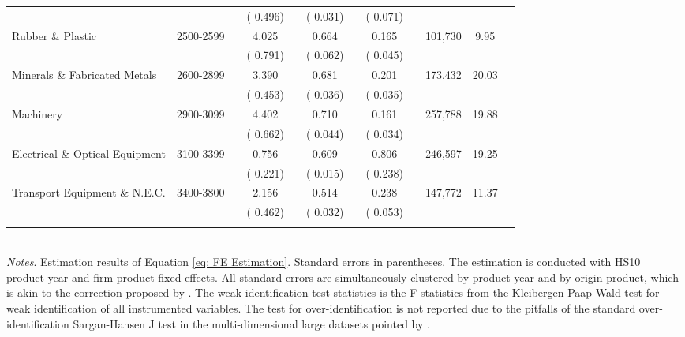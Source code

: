 \begin{adjustwidth}{-0.25in}{-0.0in}
\begin{tabular}{lccccccccccc}
& && \footnotesize( 0.496) && \footnotesize( 0.031) && \footnotesize( 0.071) &&   &   \\ \addlinespace                                                                                                            Rubber \& Plastic  & 2500-2599 && 4.025&& 0.664&& 0.165&&  101,730&9.95\\
& && \footnotesize( 0.791) && \footnotesize( 0.062) && \footnotesize( 0.045) &&   &   \\ \addlinespace                                                                                                            Minerals \& Fabricated Metals  & 2600-2899 && 3.390&& 0.681&& 0.201&&  173,432&20.03\\
& && \footnotesize( 0.453) && \footnotesize( 0.036) && \footnotesize( 0.035) &&   &   \\ \addlinespace                                                                                                            Machinery  & 2900-3099 && 4.402&& 0.710&& 0.161&&  257,788&19.88\\
& && \footnotesize( 0.662) && \footnotesize( 0.044) && \footnotesize( 0.034) &&   &   \\ \addlinespace                                                                                                            Electrical \& Optical Equipment  & 3100-3399 && 0.756&& 0.609&& 0.806&&  246,597&19.25\\
& && \footnotesize( 0.221) && \footnotesize( 0.015) && \footnotesize( 0.238) &&   &   \\ \addlinespace                                                                                                            Transport Equipment \& N.E.C.  & 3400-3800 && 2.156&& 0.514&& 0.238&&  147,772&11.37\\
& && \footnotesize( 0.462) && \footnotesize( 0.032) && \footnotesize( 0.053) &&   &   \\ \addlinespace                                                                                                            \bottomrule \\ \end{tabular} \vspace{-0.2in} \\
\footnotesize {\it Notes}. Estimation results of Equation \eqref{eq: FE Estimation}. Standard errors in parentheses. The estimation is conducted with HS10 product-year and firm-product fixed effects.
All standard errors are simultaneously clustered by product-year and by origin-product, which is akin to the correction proposed by \citet{adao2019shift}.
The weak identification test statistics is the F statistics from the Kleibergen-Paap Wald test for weak identification of all instrumented variables.
The test for over-identification is not reported due to the pitfalls of the standard over-identification Sargan-Hansen J test in the multi-dimensional large datasets pointed by \cite{AngrsitEtAl96}.
\end{adjustwidth}